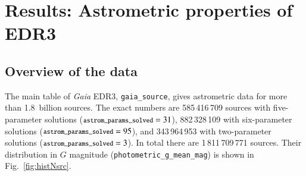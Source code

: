 \documentclass[longauth]{aa} %
\newcommand{\gacs}[1]{{\footnotesize\texttt{#1}}}
\begin{document}
\section{Results: Astrometric properties of EDR3}
\label{sec:results}

\subsection{Overview of the data}
\label{sec:overviewData}

The main table of \textit{Gaia} EDR3, \gacs{gaia\_source}, gives
astrometric data for more than 1.8~billion sources. The exact numbers are
585\,416\,709 sources with five-parameter solutions ($\gacs{astrom\_params\_solved}=31$),
882\,328\,109 with six-parameter solutions ($\gacs{astrom\_params\_solved}=95$), and
343\,964\,953 with two-parameter solutions ($\gacs{astrom\_params\_solved}=3$).
In total there are 1\,811\,709\,771 sources. 
Their distribution in $G$ magnitude (\gacs{photometric\_g\_mean\_mag})
is shown in Fig.~\ref{fig:histNsrc}.
\end{document}
